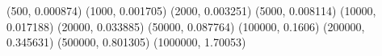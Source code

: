 (500, 0.000874) (1000, 0.001705) (2000, 0.003251) (5000, 0.008114) (10000, 0.017188) (20000, 0.033885) (50000, 0.087764) (100000, 0.1606) (200000, 0.345631) (500000, 0.801305) (1000000, 1.70053) 